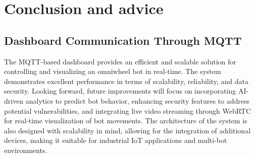
\section{Conclusion and advice}

\subsection{Dashboard Communication Through MQTT}
The MQTT-based dashboard provides an efficient and scalable solution for controlling and visualizing an omniwheel bot in real-time. 
The system demonstrates excellent performance in terms of scalability, reliability, and data security. Looking forward, future improvements 
will focus on incorporating AI-driven analytics to predict bot behavior, enhancing security features to address potential vulnerabilities, and 
integrating live video streaming through WebRTC for real-time visualization of bot movements. The architecture of the system is also designed 
with scalability in mind, allowing for the integration of additional devices, making it suitable for industrial IoT applications and multi-bot environments.
